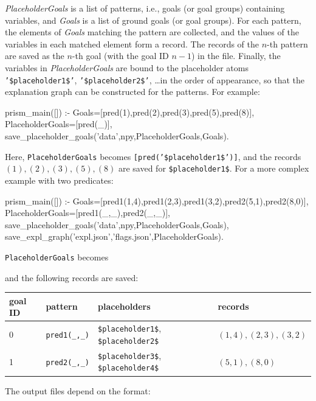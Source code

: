 \documentclass[a4paper]{report}
\begin{document}
{\it PlaceholderGoals} is a list of patterns, i.e., goals (or goal groups)
containing variables, and {\it Goals} is a list of ground goals (or goal
groups).  For each pattern, the elements of {\it Goals} matching the
pattern are collected, and the values of the variables in each matched
element form a record.  The records of the $n$-th pattern are saved as the
$n$-th goal (with the goal ID $n-1$) in the file.  Finally, the variables
in {\it PlaceholderGoals} are bound to the placeholder atoms {\tt
	'\$placeholder1\$'}, {\tt '\$placeholder2\$'}, \ldots in the order of
appearance, so that the explanation graph can be constructed for the
patterns.  For example:
\begin{prologcode}
prism_main([]) :-
    Goals=[pred(1),pred(2),pred(3),pred(5),pred(8)],
    PlaceholderGoals=[pred(_)],
    save_placeholder_goals('data',npy,PlaceholderGoals,Goals).
\end{prologcode}
Here, {\tt PlaceholderGoals} becomes {\tt [pred('\$placeholder1\$')]}, and
the records $(1), (2), (3), (5), (8)$ are saved for {\tt \$placeholder1\$}.
For a more complex example with two predicates:
\begin{prologcode}
prism_main([]) :-
    Goals=[pred1(1,4),pred1(2,3),pred1(3,2),pred2(5,1),pred2(8,0)],
    PlaceholderGoals=[pred1(_,_),pred2(_,_)],
    save_placeholder_goals('data',npy,PlaceholderGoals,Goals),
    save_expl_graph('expl.json','flags.json',PlaceholderGoals).
\end{prologcode}
{\tt PlaceholderGoals} becomes
\begin{prologcode}
\end{prologcode}
and the following records are saved:
\begin{center}
	\begin{tabular}{llll}
		\toprule
		goal ID & pattern & placeholders & records \\
		\midrule
		0 & {\tt pred1(\_,\_)} & {\tt \$placeholder1\$}, {\tt \$placeholder2\$} & $(1,4),(2,3),(3,2)$ \\
		1 & {\tt pred2(\_,\_)} & {\tt \$placeholder3\$}, {\tt \$placeholder4\$} & $(5,1),(8,0)$ \\
		\bottomrule
	\end{tabular}
\end{center}
The output files depend on the format:
\end{document}
